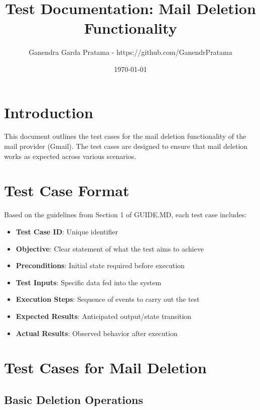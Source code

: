 \documentclass[12pt,a4paper]{article}
\title{Test Documentation: Mail Deletion Functionality}
\author{Ganendra Garda Pratama - https://github.com/GanendrPratama}
\date{\today}
\begin{document}
\maketitle

\section{Introduction}
This document outlines the test cases for the mail deletion functionality of the mail provider (Gmail). The test cases are designed to ensure that mail deletion works as expected across various scenarios.

\section{Test Case Format}
Based on the guidelines from Section 1 of GUIDE.MD, each test case includes:
\begin{itemize}
\item \textbf{Test Case ID}: Unique identifier
\item \textbf{Objective}: Clear statement of what the test aims to achieve
\item \textbf{Preconditions}: Initial state required before execution
\item \textbf{Test Inputs}: Specific data fed into the system
\item \textbf{Execution Steps}: Sequence of events to carry out the test
\item \textbf{Expected Results}: Anticipated output/state transition
\item \textbf{Actual Results}: Observed behavior after execution
\end{itemize}

\section{Test Cases for Mail Deletion}

\subsection{Basic Deletion Operations}
\end{document}

